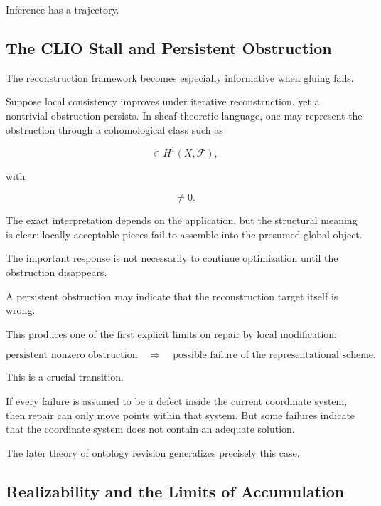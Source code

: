 \documentclass[11pt]{article}
\theoremstyle{remark}
\begin{document}
Inference has a trajectory.

\subsection{The CLIO Stall and Persistent Obstruction}

The reconstruction framework becomes especially informative when gluing fails.

Suppose local consistency improves under iterative reconstruction, yet a nontrivial obstruction persists. In sheaf-theoretic language, one may represent the obstruction through a cohomological class such as

\begin{equation}
[\omega]\in H^1(X,\mathcal{F}),
\end{equation}

with

\begin{equation}
[\omega]\neq 0.
\end{equation}

The exact interpretation depends on the application, but the structural meaning is clear: locally acceptable pieces fail to assemble into the presumed global object.

The important response is not necessarily to continue optimization until the obstruction disappears.

A persistent obstruction may indicate that the reconstruction target itself is wrong.

This produces one of the first explicit limits on repair by local modification:

\begin{equation}
\text{persistent nonzero obstruction}
\quad\Rightarrow\quad
\text{possible failure of the representational scheme}.
\end{equation}

This is a crucial transition.

If every failure is assumed to be a defect inside the current coordinate system, then repair can only move points within that system. But some failures indicate that the coordinate system does not contain an adequate solution.

The later theory of ontology revision generalizes precisely this case.

\subsection{Realizability and the Limits of Accumulation}
\end{document}
